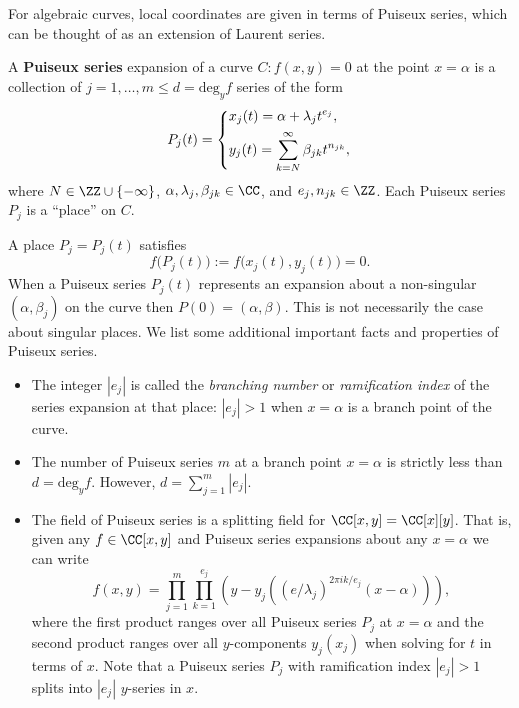 For algebraic curves, local coordinates are given in terms of Puiseux
series, which can be thought of as an extension of Laurent series.
\begin{definition} \label{def: puiseux}
  A {\bf Puiseux series} expansion of a curve $C : f(x,y) = 0$ at the
  point $x=\alpha$ is a collection of $j = 1,\ldots,m \leq d =
  \text{deg}_y f$ series of the form
  \begin{align*}
      P_j(t) =
      \begin{dcases}
        x_j(t) = \alpha + \lambda_j t^{e_j}, \\
        y_j(t) = \sum_{k=N}^\infty \beta_{jk} t^{n_{jk}},
      \end{dcases}
  \end{align*}
  where $N \in \ZZ \cup \{-\infty\}$, $\alpha, \lambda_j, \beta_{jk} \in
  \CC$, and $e_j,n_{jk} \in \ZZ$. Each Puiseux series $P_j$ is a
  ``place'' on $C$.
\end{definition}
A place $P_j = P_j(t)$ satisfies
\[
    f\big(P_j(t)\big) := f\big(x_j(t), y_j(t)\big) = 0.
\]
When a Puiseux series $P_j(t)$ represents an expansion about a
non-singular $(\alpha, \beta_j)$ on the curve then $P(0) =
(\alpha,\beta)$. This is not necessarily the case about singular
places. We list some additional important facts and properties of
Puiseux series.
\begin{itemize}
  \item The integer $|e_j|$ is called the {\it branching number} or {\it
    ramification index} of the series expansion at that place: $|e_j| >
    1$ when $x = \alpha$ is a branch point of the curve.
  \item The number of Puiseux series $m$ at a branch point $x = \alpha$
    is strictly less than $d = \text{deg}_y f$. However, $d =
    \sum_{j=1}^m |e_j|$.
  \item The field of Puiseux series is a splitting field for $\CC[x,y] =
    \CC[x][y]$. That is, given any $f \in \CC[x,y]$ and Puiseux series
    expansions about any $x=\alpha$ we can write
    \[
        f(x,y) = \prod_{j=1}^m \prod_{k=1}^{e_j} \left(
                 y - y_j\left(
                     (e/\lambda_j)^{2 \pi ik / e_j}(x-\alpha)
                     \right)
                 \right),
    \]
    where the first product ranges over all Puiseux series $P_j$ at
    $x=\alpha$ and the second product ranges over all $y$-components
    $y_j(x_j)$ when solving for $t$ in terms of $x$. Note that a Puiseux
    series $P_j$ with ramification index $|e_j|>1$ splits into $|e_j|$
    $y$-series in $x$.
\end{itemize}

